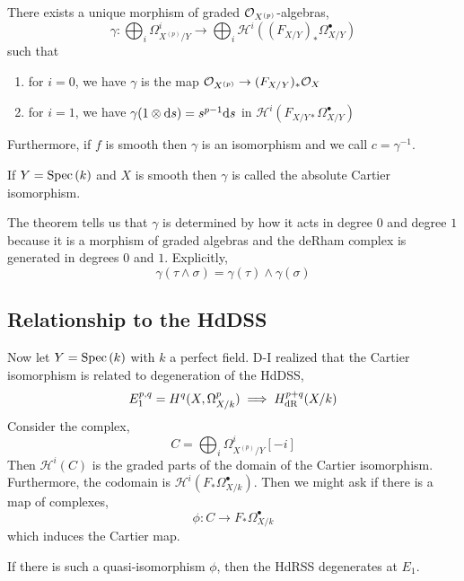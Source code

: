\documentclass[12pt]{article}
\begin{document}
\renewcommand{\H}{\mathcal{H}}

\begin{theorem}[Cartier]
There exists a unique morphism of graded $\mathcal{O}_{X^{(p)}}$-algebras,
\[ \gamma : \bigoplus_{i} \Omega^i_{X^{(p)}/Y} \to \bigoplus_i \H^i((F_{X/Y})_* \Omega^\bullet_{X/Y}) \]
such that
\begin{enumerate}
\item for $i = 0$, we have $\gamma$ is the map $\mathcal{O}_{X^{(p)}} \to (F_{X/Y})_* \mathcal{O}_{X}$
\item for $i = 1$, we have $\gamma(1 \otimes \mathrm{d}{s}) = s^{p-1} \mathrm{d}{s}$ in $\H^i(F_{X/Y*} \Omega^\bullet_{X/Y})$
\end{enumerate}
Furthermore, if $f$ is smooth then $\gamma$ is an isomorphism and we call $c = \gamma^{-1}$.
\end{theorem}

\begin{rmk}
If $Y = \mathrm{Spec}\left( k \right)$ and $X$ is smooth then $\gamma$ is called the absolute Cartier isomorphism. 
\end{rmk}

\begin{rmk}
The theorem tells us that $\gamma$ is determined by how it acts in degree $0$ and degree $1$ because it is a morphism of graded algebras and the deRham complex is generated in degrees $0$ and $1$. Explicitly,
\[ \gamma(\tau \wedge \sigma) = \gamma(\tau) \wedge \gamma(\sigma) \]
\end{rmk}

\subsection{Relationship to the HdDSS}

Now let $Y = \mathrm{Spec}\left( k \right)$ with $k$ a perfect field.
D-I realized that the Cartier isomorphism is related to degeneration of the HdDSS,
\[ E_1^{p,q} = H^q(X, \Omega_{X/k}^p) \implies H^{p+q}_{\mathrm{dR}}(X/k) \]
Consider the complex,
\[ C = \bigoplus_i \Omega^i_{X^{(p)}/Y} [-i] \]
Then $\H^i(C)$ is the graded parts of the domain of the Cartier isomorphism. Furthermore, the codomain is $\H^i(F_* \Omega^\bullet_{X/k})$. Then we might ask if there is a map of complexes,
\[ \phi : C \to F_* \Omega^\bullet_{X/k} \]
which induces the Cartier map. 

\begin{prop}
If there is such a quasi-isomorphism $\phi$, then the HdRSS degenerates at $E_1$.
\end{prop}
\end{document}
